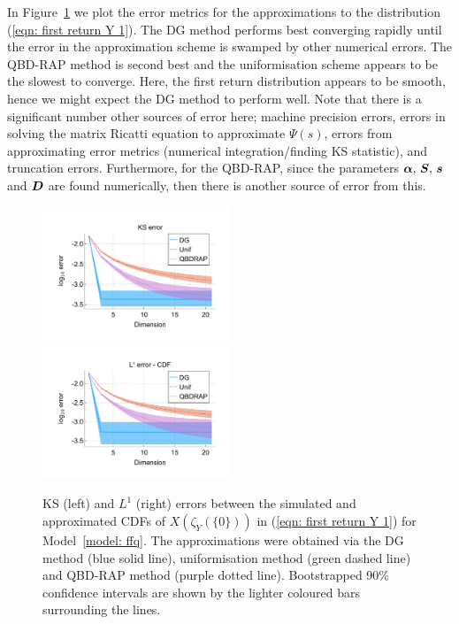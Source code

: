 In Figure~\ref{fig: ffq return cts} we plot the error metrics for the approximations to the distribution (\ref{eqn: first return Y 1}). The DG method performs best converging rapidly until the error in the approximation scheme is swamped by other numerical errors. The QBD-RAP method is second best and the uniformisation scheme appears to be the slowest to converge. Here, the first return distribution appears to be smooth, hence we might expect the DG method to perform well. Note that there is a significant number other sources of error here; machine precision errors, errors in solving the matrix Ricatti equation to approximate \(\mathbb \Psi(s)\), errors from approximating error metrics (numerical integration/finding KS statistic), and truncation errors. Furthermore, for the QBD-RAP, since the parameters \(\boldsymbol \alpha,\,\boldsymbol S,\,\boldsymbol s\,\) and \(\boldsymbol D\) are found numerically, then there is another source of error from this. 
\begin{figure}[h]
	\centering
	\includegraphics[width=0.5\textwidth,trim={0.75cm 0.8cm 0.25cm 1.25cm},clip]{chapter6/figs/ffq/cts/ks_error_formatted.pdf}%
	\includegraphics[width=0.5\textwidth,trim={0.75cm 0.8cm 0.25cm 1.25cm},clip]{chapter6/figs/ffq/cts/l1_cdf_error_formatted.pdf}
	\caption{KS (left) and \(L^1\) (right) errors between the simulated and approximated CDFs of \(X(\zeta_{Y}(\{0\}))\) in (\ref{eqn: first return Y 1}) for Model~\ref{model: ffq}. The approximations were obtained via the DG method (blue solid line), uniformisation method (green dashed line) and QBD-RAP method (purple dotted line). Bootstrapped 90\% confidence intervals are shown by the lighter coloured bars surrounding the lines.} 
	\label{fig: ffq return cts} 
\end{figure}
